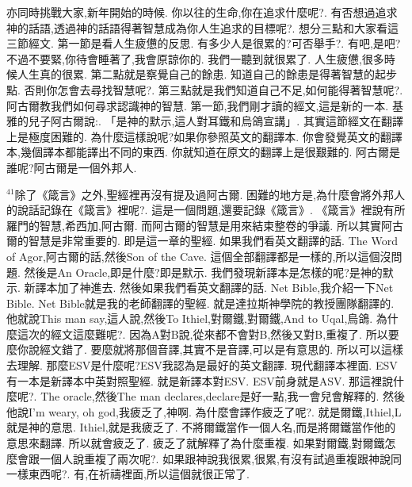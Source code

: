 \documentclass{book}
\begin{document}
亦同時挑戰大家,新年開始的時候.
你以往的生命,你在追求什麼呢?.
有否想過追求神的話語,透過神的話語得著智慧成為你人生追求的目標呢?.
想分三點和大家看這三節經文.
第一節是看人生疲憊的反思.
有多少人是很累的?可否舉手?.
有吧,是吧?不過不要緊,你待會睡著了,我會原諒你的.
我們一聽到就很累了.
人生疲憊,很多時候人生真的很累.
第二點就是察覺自己的餘患.
知道自己的餘患是得著智慧的起步點.
否則你怎會去尋找智慧呢?.
第三點就是我們知道自己不足,如何能得著智慧呢?.
阿古爾教我們如何尋求認識神的智慧.
第一節,我們剛才讀的經文,這是新的一本.
基雅的兒子阿古爾說:.
「是神的默示,這人對耳鐵和烏鴿宣講」.
其實這節經文在翻譯上是極度困難的.
為什麼這樣說呢?如果你參照英文的翻譯本.
你會發覺英文的翻譯本,幾個譯本都能譯出不同的東西.
你就知道在原文的翻譯上是很艱難的.
阿古爾是誰呢?阿古爾是一個外邦人.

$^{41}$除了《箴言》之外,聖經裡再沒有提及過阿古爾.
困難的地方是,為什麼會將外邦人的說話記錄在《箴言》裡呢?.
這是一個問題,還要記錄《箴言》.
《箴言》裡說有所羅門的智慧,希西加,阿古爾.
而阿古爾的智慧是用來結束整卷的爭議.
所以其實阿古爾的智慧是非常重要的.
即是這一章的聖經.
如果我們看英文翻譯的話.
The Word of Agor,阿古爾的話,然後Son of the Cave.
這個全部翻譯都是一樣的,所以這個沒問題.
然後是An Oracle,即是什麼?即是默示.
我們發現新譯本是怎樣的呢?是神的默示.
新譯本加了神進去.
然後如果我們看英文翻譯的話.
Net Bible,我介紹一下Net Bible.
Net Bible就是我的老師翻譯的聖經.
就是達拉斯神學院的教授團隊翻譯的.
他就說This man say,這人說,然後To Ithiel,對爾鐵,對爾鐵,And to Uqal,烏鴿.
為什麼這次的經文這麼難呢?.
因為A對B說,從來都不會對B,然後又對B,重複了.
所以要麼你說經文錯了.
要麼就將那個音譯,其實不是音譯,可以是有意思的.
所以可以這樣去理解.
那麼ESV是什麼呢?ESV我認為是最好的英文翻譯.
現代翻譯本裡面.
ESV有一本是新譯本中英對照聖經.
就是新譯本對ESV.
ESV前身就是ASV.
那這裡說什麼呢?.
The oracle,然後The man declares,declare是好一點,我一會兒會解釋的.
然後他說I'm weary, oh god,我疲乏了,神啊.
為什麼會譯作疲乏了呢?.
就是爾鐵,Ithiel,L就是神的意思.
Ithiel,就是我疲乏了.
不將爾鐵當作一個人名,而是將爾鐵當作他的意思來翻譯.
所以就會疲乏了.
疲乏了就解釋了為什麼重複.
如果對爾鐵,對爾鐵怎麼會跟一個人說重複了兩次呢?.
如果跟神說我很累,很累,有沒有試過重複跟神說同一樣東西呢?.
有,在祈禱裡面,所以這個就很正常了.
\end{document}

